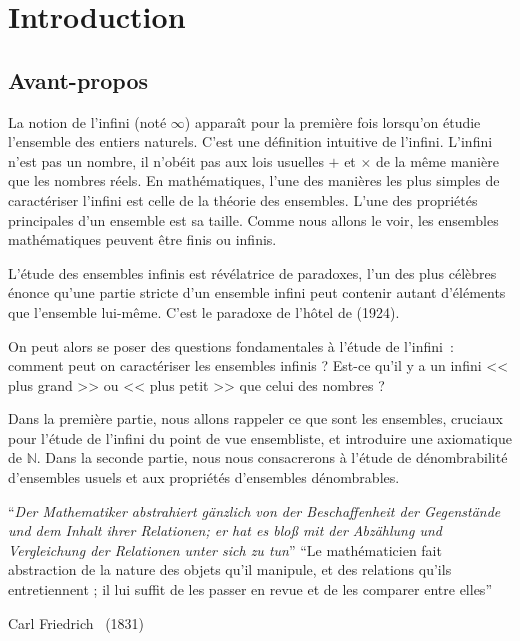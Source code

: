 \documentclass[a4paper,french]{memoir}
\begin{document}
\begin{titlingpage}

\end{titlingpage}
\frontmatter
\tableofcontents
\part{Introduction}

\chapter{Avant-propos}
\renewcommand*{\cftappendixname}{Appendix\space}
La notion de l'infini (noté $\infty$) apparaît pour la première fois lorsqu'on étudie l'ensemble des entiers naturels. C'est une définition intuitive de l'infini. L'infini n'est pas un nombre, il n'obéit pas aux lois usuelles $+$ et $\times$ de la même manière que les nombres réels. En mathématiques, l'une des manières les plus simples de caractériser l'infini est celle de la théorie des ensembles. L'une des propriétés principales d'un ensemble est sa taille. Comme nous allons le voir, les ensembles mathématiques peuvent être finis ou infinis.

L'étude des ensembles infinis est révélatrice de paradoxes, l'un des plus célèbres  énonce qu'une partie stricte d'un ensemble infini peut contenir autant d'éléments que l'ensemble lui-même. C'est le paradoxe de l'hôtel de  (1924).

On peut alors se poser des questions fondamentales à l'étude de l'infini~: comment peut on caractériser les ensembles infinis ? Est-ce qu'il y a un infini << plus grand >> ou << plus petit >> que celui des nombres ?  

Dans la première partie, nous allons rappeler ce que sont les ensembles, cruciaux pour l'étude de l'infini du point de vue ensembliste, et introduire une axiomatique de $\mathbb{N}$. 
Dans la seconde partie, nous nous consacrerons à l'étude de dénombrabilité d'ensembles usuels et aux propriétés d'ensembles dénombrables.

\epigraph{%
	\enquote{\itshape Der Mathematiker abstrahiert gänzlich von der Beschaffenheit der Gegenstände und dem Inhalt ihrer Relationen; er hat es bloß mit der Abzählung und Vergleichung der Relationen unter sich zu tun}\newline \newline
\enquote{Le mathématicien fait abstraction de la nature des objets qu'il manipule, et des relations qu'ils entretiennent ; il lui suffit de les passer en revue et de les comparer entre elles}
}{Carl Friedrich \footnotemark~(1831)}
\end{document}
